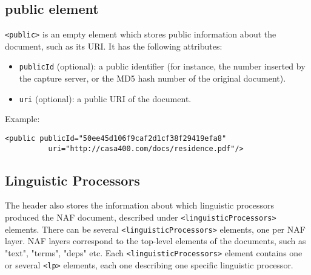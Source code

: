 



\subsection{public element}
\label{sec:public-element}

\texttt{<public>} is an empty element which stores public information about
the document, such as its URI. It has the following attributes:
\begin{itemize}
\item \texttt{publicId} (optional): a public identifier (for instance, the
  number inserted by the capture server, or the MD5 hash number of the
  original document).
\item \texttt{uri} (optional): a public URI of the document.
\end{itemize}

Example:
\begin{Verbatim}[fontsize=\small]
  <public publicId="50ee45d106f9caf2d1cf38f29419efa8"
          uri="http://casa400.com/docs/residence.pdf"/>
\end{Verbatim}

\subsection{Linguistic Processors}
\label{sec:ling-proc}

The header also stores the information about which linguistic processors
produced the NAF document, described under \texttt{<linguisticProcessors>}
elements. There can be several \texttt{<linguisticProcessors>} elements, one
per NAF layer. NAF layers correspond to the top-level elements of the
documents, such as "text", "terms", "deps" etc.  Each
\texttt{<linguisticProcessors>} element contains one or several
\texttt{<lp>} elements, each one describing one specific linguistic
processor.\\

